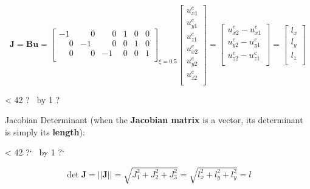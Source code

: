 \documentclass[10pt,b5paper,titlepage]{book}
\newcommand{\m}{\mathbf}
\newcommand{\repeatit}[3][10]{%
    \myloopcounter1%
    \loop\ifnum\myloopcounter < #1
    #2#3%
    \advance\myloopcounter by 1%
    \repeat%
    #2%
}
\newenvironment{qbox}
{
\begin{center}
    \repeatit[42]{?}{\ }
\end{center}
}
{
\begin{center}
    \repeatit[42]{?`}{\ }
\end{center}
}
\begin{document}
\begin{equation}
    \m{J} = \m{B} \m{u} =
    \begin{bmatrix}
        -1 & \phantom{-}0 & \phantom{-}0 & 1 & 0 & 0 \\
        \phantom{-}0 & -1 & \phantom{-}0 & 0 & 1 & 0  \\
        \phantom{-}0 & \phantom{-}0 & -1 & 0 & 0 & 1  \\
    \end{bmatrix}_{\xi=0.5}
    \begin{bmatrix}
        u_{x1}^e \\
        u_{y1}^e \\
        u_{z1}^e \\
        u_{x2}^e \\
        u_{y2}^e \\
        u_{z2}^e \\
    \end{bmatrix}
    = \begin{bmatrix}
        u_{x2}^e - u_{x1}^e \\
        u_{y2}^e - u_{y1}^e \\
        u_{z2}^e - u_{z1}^e \\
    \end{bmatrix}
    = \begin{bmatrix}
        l_x \\
        l_y \\
        l_z \\
    \end{bmatrix}
\end{equation}

\begin{qbox}

    Jacobian Determinant (when the \textbf{Jacobian matrix} is a vector, its
    determinant is simply its \textbf{length}):

\end{qbox}

\begin{equation}
    \det \m{J} = || \m{J} || = \sqrt{J_1^2 + J_2^2 + J_3^2}
               = \sqrt{l_x^2 + l_y^2 + l_y^2} = l
\end{equation}
\end{document}
